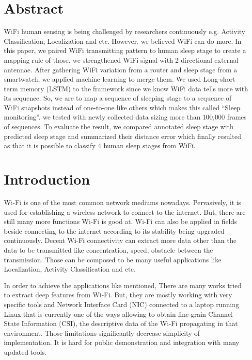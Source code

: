 \documentclass[10pt,letterpaper]{article}
\begin{document}
	\section*{Abstract}
	WiFi human sensing is being challenged by researchers continuously e.g. Activity Classification, Localization and etc. However, we believed WiFi can do more. In this paper, we paired WiFi transmitting pattern to human sleep stage to create a mapping rule of those. we strengthened WiFi signal with 2 directional external antennae. After gathering WiFi variation from a router and sleep stage from a smartwatch, we applied machine learning to merge them. We used Long-short term memory (LSTM) to the framework since we know WiFi data tells more with its sequence. So, we are to map a sequence of sleeping stage to a sequence of WiFi snapshots instead of one-to-one like others which makes this called ``Sleep monitoring''. we tested with newly collected data sizing more than 100,000 frames of sequences. To evaluate the result, we compared annotated sleep stage with predicted sleep stage and summarized their distance error which finally resulted as that it is possible to classify 4 human sleep stages from WiFi.
	

	
	\linenumbers
	
	\section*{Introduction}
	Wi-Fi is one of the most common network mediums nowadays. Pervasively, it is used for establishing a wireless network to connect to the internet. But, there are still many more functions Wi-Fi is good at. Wi-Fi can also be applied in fields beside connecting to the internet according to its stability being upgraded continuously. Decent Wi-Fi connectivity can extract more data other than the data to be transmitted like concentration, speed, obstacle between the transmission. Those can be composed to be many useful applications like Localization, Activity Classification and etc.
	
	In order to achieve the applications like mentioned, There are many works tried to extract deep features from Wi-Fi. But, they are mostly working with very specific tools and Network Interface Card (NIC) connected to a laptop running Linux that is currently one of the ways allowing to obtain fine-grain Channel State Information (CSI), the descriptive data of the  Wi-Fi propagating in that environment. Those limitations significantly decrease simplicity of implementation. It is hard for public demonstration and integration with many updated tools.
	
\end{document}
